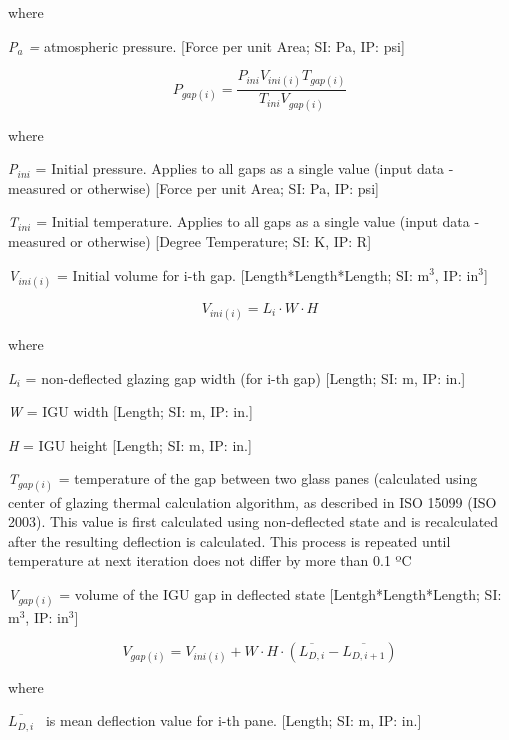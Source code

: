 where

\emph{P\(_{a}\) =} atmospheric pressure. {[}Force per unit Area; SI: Pa, IP: psi{]}

\begin{equation}
{P_{gap\left( i \right)}} = \frac{{{P_{ini}}{V_{ini\left( i \right)}}{T_{gap\left( i \right)}}}}{{{T_{ini}}{V_{gap\left( i \right)}}}}
\end{equation}

where

\emph{P\(_{ini}\)} = Initial pressure. Applies to all gaps as a single value (input data - measured or otherwise) {[}Force per unit Area; SI: Pa, IP: psi{]}

\emph{T\(_{ini}\)} = Initial temperature. Applies to all gaps as a single value (input data - measured or otherwise) {[}Degree Temperature; SI: K, IP: R{]}

\emph{V\(_{ini(i)}\)} = Initial volume for i-th gap. {[}Length*Length*Length; SI: m\(^{3}\), IP: in\(^{3}\){]}

\begin{equation}
{V_{ini\left( i \right)}} = {L_i}\cdot W\cdot H
\end{equation}

where

\emph{L\(_{i}\)} = non-deflected glazing gap width (for i-th gap) {[}Length; SI: m, IP: in.{]}

\emph{W} = IGU width {[}Length; SI: m, IP: in.{]}

\emph{H} = IGU height {[}Length; SI: m, IP: in.{]}

\emph{T\(_{gap(i)}\)} = temperature of the gap between two glass panes (calculated using center of glazing thermal calculation algorithm, as described in ISO 15099 (ISO 2003). This value is first calculated using non-deflected state and is recalculated after the resulting deflection is calculated. This process is repeated until temperature at next iteration does not differ by more than 0.1 ºC

\emph{V\(_{gap(i)}\)} = volume of the IGU gap in deflected state {[}Lentgh*Length*Length; SI: m\(^{3}\), IP: in\(^{3}\){]}

\begin{equation}
{V_{gap\left( i \right)}} = {V_{ini\left( i \right)}} + W\cdot H\cdot \left( {\overline {{L_{D,i}}}  - \overline {{L_{D,i + 1}}} } \right)
\label{eq:IGUGapVolume}
\end{equation}

where

\(\overline {{L_{D,i}}}\) ~is mean deflection value for i-th pane. {[}Length; SI: m, IP: in.{]}

